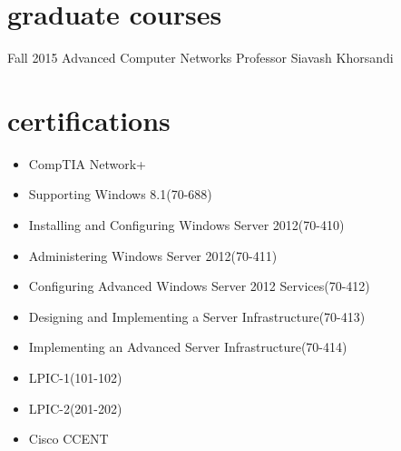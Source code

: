 \documentclass[]{friggeri-cv} %
\begin{document}

\section{graduate courses}

\begin{entrylist}

\entry
{Fall 2015}
{Advanced Computer Networks}
{Professor Siavash Khorsandi}
{}


\end{entrylist}


\section{certifications}
\begin{itemize}
	\item CompTIA Network+
	\item Supporting Windows 8.1(70-688)
	\item Installing and Configuring Windows Server 2012(70-410)
	\item Administering Windows Server 2012(70-411)
	\item Configuring Advanced Windows Server 2012 Services(70-412)
	\item Designing and Implementing a Server Infrastructure(70-413)
	\item Implementing an Advanced Server Infrastructure(70-414)
	\item LPIC-1(101-102)
	\item LPIC-2(201-202)
	\item Cisco CCENT
\end{itemize}
\end{document}
